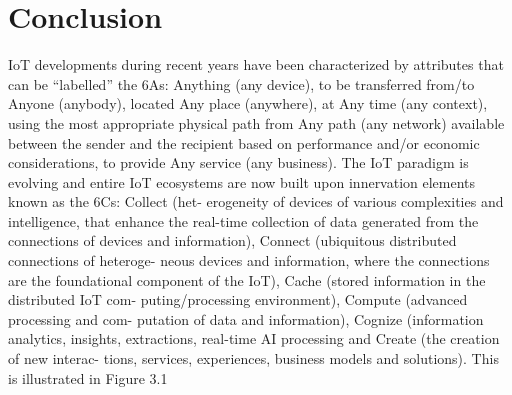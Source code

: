 \section{Conclusion}

IoT developments during recent years have been characterized by
attributes that can be “labelled” the 6As: Anything (any device), to be
transferred from/to Anyone (anybody), located Any place (anywhere), at
Any time (any context), using the most appropriate physical path from Any
path (any network) available between the sender and the recipient based
on performance and/or economic considerations, to provide Any service
(any business). The IoT paradigm is evolving and entire IoT ecosystems
are now built upon innervation elements known as the 6Cs: Collect (het-
erogeneity of devices of various complexities and intelligence, that enhance
the real-time collection of data generated from the connections of devices
and information), Connect (ubiquitous distributed connections of heteroge-
neous devices and information, where the connections are the foundational
component of the IoT), Cache (stored information in the distributed IoT com-
puting/processing environment), Compute (advanced processing and com-
putation of data and information), Cognize (information analytics, insights,
extractions, real-time AI processing and Create (the creation of new interac-
tions, services, experiences, business models and solutions). This is illustrated
in Figure 3.1






















